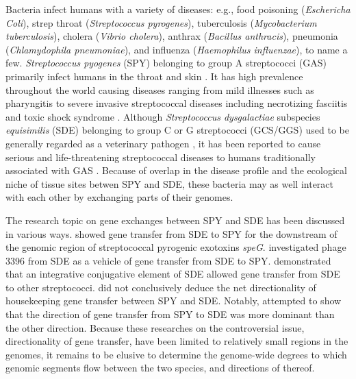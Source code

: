 \documentclass[english]{article}
\begin{document}
Bacteria infect humans with a variety of diseases: e.g., food poisoning
(\textit{Eschericha Coli}), strep throat (\textit{Streptococcus pyrogenes}),
tuberculosis (\textit{Mycobacterium tuberculosis}), cholera (\textit{Vibrio
cholera}), anthrax (\textit{Bacillus anthracis}), pneumonia
(\textit{Chlamydophila pneumoniae}), and influenza (\textit{Haemophilus
influenzae}), to name a few.  \textit{Streptococcus pyogenes} (SPY) belonging to
group A streptococci (GAS) primarily infect humans in the throat and skin
\citep{Broyles2009}. It has high prevalence throughout the world causing
diseases ranging from mild illnesses such as pharyngitis to severe invasive
streptococcal diseases including necrotizing fasciitis and toxic shock syndrome
\citep{Cunningham2000a}.  Although \textit{Streptococcus dysgalactiae}
subspecies \textit{equisimilis} (SDE) belonging to group C or G streptococci
(GCS/GGS) used to be generally regarded as a veterinary pathogen
\citep{Vandamme1996}, it has been reported to cause serious and life-threatening
streptococcal diseases to humans traditionally associated with GAS
\citep[e.g.,][]{Brandt2009}.  Because of overlap in the disease profile and the
ecological niche of tissue sites betwen SPY and SDE, these bacteria may as well
interact with each other by exchanging parts of their genomes.

The research topic on gene exchanges between SPY and SDE has been discussed in
various ways. \citet{Sachse2002} showed gene transfer from SDE to SPY for the
downstream of the genomic region of streptococcal pyrogenic exotoxins
\textit{speG}. \citet{Davies2007} investigated phage 3396 from SDE as a vehicle
of gene transfer from SDE to SPY. \citet{Davies2009} demonstrated that an
integrative conjugative element of SDE allowed gene transfer from SDE to other
streptococci.  \citet{Ahmad2009} did not conclusively deduce the net
directionality of housekeeping gene transfer between SPY and SDE.  Notably,
\citet{Kalia2001} attempted to show that the direction of gene transfer from SPY
to SDE was more dominant than the other direction.  Because these researches on
the controversial issue, directionality of gene transfer, have been limited to
relatively small regions in the genomes, it remains to be elusive to determine
the genome-wide degrees to which genomic segments flow between the two species,
and directions of thereof.
\end{document}
